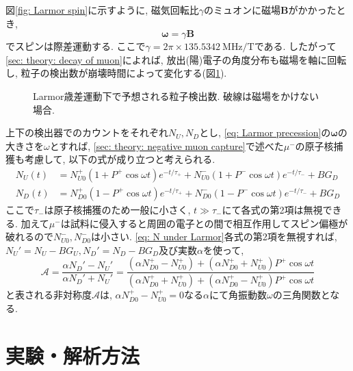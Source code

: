 \documentclass[dvipdfmx]{jsarticle}
\begin{document}
図\ref{fig: Larmor spin}に示すように, 磁気回転比$\gamma$のミュオンに磁場$\bm{B}$がかかったとき,
\begin{equation}
    \label{eq: Larmor precession}
    \bm{\omega}=\gamma\bm{B}
\end{equation}
でスピンは際差運動する.
ここで$\gamma=2\pi\times\SI{135.5342}{\mega\hertz/\tesla}$である.
したがって\ref{sec: theory: decay of muon}によれば, 放出(陽)電子の角度分布も磁場を軸に回転し, 粒子の検出数が崩壊時間によって変化する(図\ref{fig: theory: N under Larmor}).

\begin{figure}
    \centering
    
    \caption[]{Larmor歳差運動下で予想される粒子検出数. 破線は磁場をかけない場合. }
    \label{fig: theory: N under Larmor}
\end{figure}

上下の検出器でのカウントをそれぞれ$N_U, N_D$とし, \eqref{eq: Larmor precession}の$\bm{\omega}$の大きさを$\omega$とすれば, \ref{sec: theory: negative muon capture}で述べた$\mu^-$の原子核捕獲も考慮して, 以下の式が成り立つと考えられる.
\begin{equation}
    \label{eq: N under Larmor}
    \begin{split}
        N_U(t)
        &=
        N_{U0}^+(1+P^+\cos\omega t)e^{-t/\tau_+}
        +
        N_{U0}^-(1+P^-\cos\omega t)e^{-t/\tau_-}
        +
        BG_D
        \\
        N_D(t)
        &=
        N_{D0}^+(1-P^+\cos\omega t)e^{-t/\tau_+}
        +
        N_{D0}^-(1-P^-\cos\omega t)e^{-t/\tau_-}
        +
        BG_D
    \end{split}
\end{equation}
ここで$\tau_-$は原子核捕獲のため一般に小さく, $t\gg\tau_-$にて各式の第2項は無視できる.
加えて$\mu^-$は試料に侵入すると周囲の電子との間で相互作用してスピン偏極が破れるので$N_{U0}^-,N_{D0}^-$は小さい.
\eqref{eq: N under Larmor}各式の第2項を無視すれば, $N_U'=N_U-BG_U, N_D'=N_D-BG_D$及び実数$\alpha$を使って,
\begin{equation}
    \label{eq: asymmetry}
    \mathscr{A}
    =
    \frac{\alpha N_D'-N_U'}{\alpha N_D'+N_U'}
    =
    \frac{(\alpha N_{D0}^+-N_{U0}^+)+(\alpha N_{D0}^++N_{U0}^+)P^+\cos\omega t}{(\alpha N_{D0}^++N_{U0}^+)+(\alpha N_{D0}^+-N_{U0}^+)P^+\cos\omega t}
\end{equation}
と表される非対称度$\mathscr{A}$は, $\alpha N_{D0}^+-N_{U0}^+=0$なる$\alpha$にて角振動数$\omega$の三角関数となる.


\section{実験・解析方法}
\end{document}
